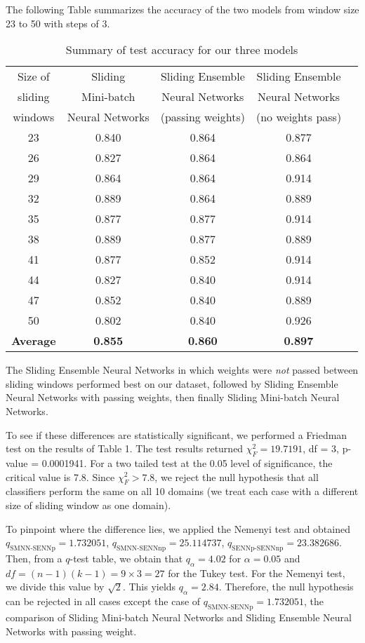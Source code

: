 \documentclass[conference]{IEEEtran}
\begin{document}
		The following Table summarizes the accuracy of the two models from window size 23 to 50 with steps of 3.
		\begin{table}[H]
			\centering
			\begin{tabular}{ccccc}
				\hline
				Size of&  Sliding& Sliding Ensemble& Sliding Ensemble\\
				sliding&  Mini-batch& Neural Networks& Neural Networks\\
				windows&  Neural Networks& (passing weights) & (no weights pass)\\
				\hline
				23 &  0.840 & 0.864 & 0.877 \\ 
				26 &  0.827 & 0.864 & 0.864 \\ 
				29 &  0.864 & 0.864 & 0.914 \\ 
				32 &  0.889 & 0.864 & 0.889 \\ 
				35 &  0.877 & 0.877 & 0.914 \\ 
				38 &  0.889 & 0.877 & 0.889 \\ 
				41 &  0.877 & 0.852 & 0.914 \\ 
				44 &  0.827 & 0.840 & 0.914 \\ 
				47 &  0.852 & 0.840 & 0.889 \\ 
				50 &  0.802 & 0.840 & 0.926 \\ 
				\hline
				\textbf{Average} & \textbf{0.855} &\textbf{0.860} &\textbf{0.897} \\
				\hline
			\end{tabular}
			\caption{Summary of test accuracy for our three models}
		\end{table}
		
		The Sliding Ensemble Neural Networks in which weights were \emph{not} passed between sliding windows performed best on our dataset, followed by Sliding Ensemble Neural Networks with passing weights, then finally Sliding Mini-batch Neural Networks.
		
		To see if these differences are statistically significant, we performed a Friedman test on the results of Table 1. The test results returned $\chi^2_F= 19.7191$, df = 3, p-value = 0.0001941. For a two tailed test at the 0.05 level of significance, the critical value is 7.8. Since $\chi_F^2 >7.8$, we reject the null hypothesis that all classifiers perform the same on all 10 domains (we treat each case with a different size of sliding window as one domain).
		
		To pinpoint where the difference lies, we applied the Nemenyi test and obtained $q_{\text{SMNN-SENNp}}= 1.732051$,  $q_{\text{SMNN-SENNnp}}=25.114737$, $q_{\text{SENNp-SENNnp}}=23.382686$.
		Then, from a $q$-test table, we obtain that $q_\alpha=4.02$ for $\alpha=0.05$ and $df = (n-1)(k-1) = 9 \times 3 = 27$ for the Tukey test. For the Nemenyi test, we divide this value by $\sqrt{2}$. This yields $q_\alpha = 2.84$. Therefore, the null hypothesis can be rejected in all cases except the case of $q_{\text{SMNN-SENNp}}= 1.732051$, the comparison of Sliding Mini-batch Neural Networks and Sliding Ensemble Neural Networks with passing weight.
		
\end{document}
